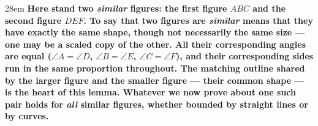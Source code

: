 \documentclass[border=4pt]{standalone}
\begin{document}
\begin{varwidth}{28em}
\large\bfseries
Here stand two \emph{similar} figures: the first figure $ABC$ and the second figure $DEF$. To say that two figures are \emph{similar} means that they have exactly the same shape, though not necessarily the same size --- one may be a scaled copy of the other. All their corresponding angles are equal ($\angle A = \angle D$, $\angle B = \angle E$, $\angle C = \angle F$), and their corresponding sides run in the same proportion throughout. The matching outline shared by the larger figure and the smaller figure --- their common shape --- is the heart of this lemma. Whatever we now prove about one such pair holds for \emph{all} similar figures, whether bounded by straight lines or by curves.
\end{varwidth}
\end{document}
